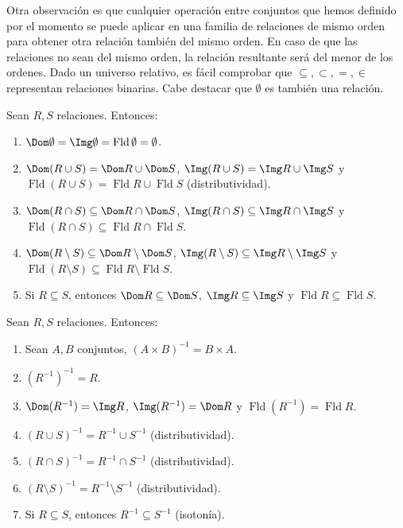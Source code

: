 \documentclass[11pt,a4paper]{book}
\DeclareMathOperator{\Fld}{Fld}
\begin{document}
Otra observación es que cualquier operación entre conjuntos que hemos definido por el momento se puede aplicar en una familia de relaciones de mismo orden para obtener otra relación también del mismo orden. En caso de que las relaciones no sean del mismo orden, la relación resultante será del menor de los ordenes. Dado un universo relativo, es fácil comprobar que $\subseteq,\subset,=,\in$ representan relaciones binarias. Cabe destacar que $\emptyset$ es también una relación.
\begin{prop}
	Sean $R,S$ relaciones. Entonces:
	\begin{enumerate}
		\item $\Dom\emptyset=\Img\emptyset=\Fld\emptyset=\emptyset$.
		\item $\Dom(R\cup S)=\Dom R\cup\Dom S$, $\Img(R\cup S)=\Img R\cup\Img S$ y $\Fld(R\cup S)=\Fld R\cup\Fld S$ (distributividad).
		\item $\Dom(R\cap S)\subseteq\Dom R\cap\Dom S$, $\Img(R\cap S)\subseteq\Img R\cap\Img S$ y $\Fld(R\cap S)\subseteq\Fld R\cap\Fld S$.
		\item $\Dom(R\setminus S)\subseteq\Dom R\setminus\Dom S$, $\Img(R\setminus S)\subseteq\Img R\setminus\Img S$ y $\Fld(R\setminus S)\subseteq\Fld R\setminus\Fld S$.
		\item Si $R\subseteq S$, entonces $\Dom R\subseteq\Dom S$, $\Img R\subseteq\Img S$ y $\Fld R\subseteq\Fld S$.
	\end{enumerate}
\end{prop}
\begin{prop}
	Sean $R,S$ relaciones. Entonces:
	\begin{enumerate}
		\item Sean $A,B$ conjuntos, $(A\times B)^{-1}=B\times A$.
		\item $(R^{-1})^{-1}=R$.
		\item $\Dom(R^{-1})=\Img R$, $\Img(R^{-1})=\Dom R$ y $\Fld(R^{-1})=\Fld R$.
		\item $(R\cup S)^{-1}=R^{-1}\cup S^{-1}$ (distributividad).
		\item $(R\cap S)^{-1}=R^{-1}\cap S^{-1}$ (distributividad).
		\item $(R\setminus S)^{-1}=R^{-1}\setminus S^{-1}$ (distributividad).
		\item Si $R\subseteq S$, entonces $R^{-1}\subseteq S^{-1}$ (isotonía).
	\end{enumerate}
\end{prop}
\end{document}
